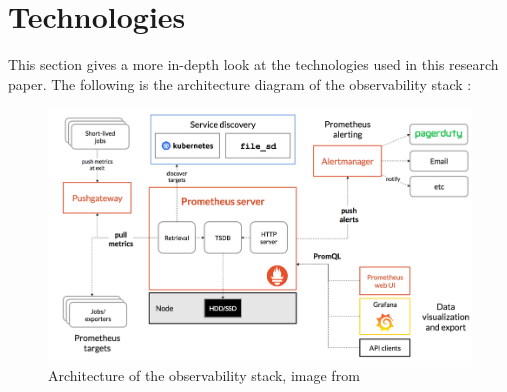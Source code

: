 \section{Technologies}
This section gives a more in-depth look at the technologies used in this research paper. The following is the
architecture diagram of the observability stack :
\begin{figure}[h]
	\centering
	\includegraphics[width=.9\linewidth]{figures/os_architecture.png}
	\caption{Architecture of the observability stack, image from\autocite{prometheusOverviewPrometheusa}}
	\label{fig:os_architecture}
\end{figure}
